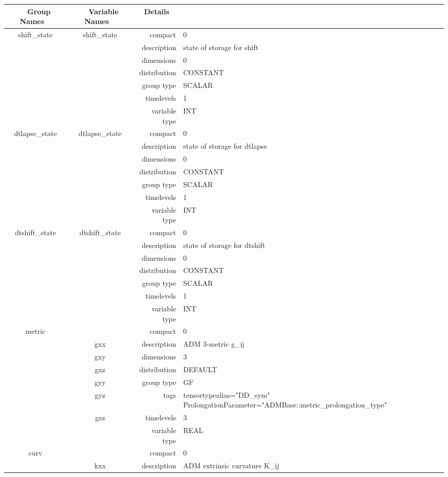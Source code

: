 \documentclass{article}
\begin{document}
\begin{tabular*}{150mm}{|c|c@{\extracolsep{\fill}}|rl|} \hline 
~ {\bf Group Names} ~ & ~ {\bf Variable Names} ~  &{\bf Details} ~ & ~\\ 
\hline 
shift\_state & shift\_state & compact & 0 \\ 
 &  & description & state of storage for shift \\ 
 &  & dimensions & 0 \\ 
 &  & distribution & CONSTANT \\ 
 &  & group type & SCALAR \\ 
 &  & timelevels & 1 \\ 
 &  & variable type & INT \\ 
\hline 
dtlapse\_state & dtlapse\_state & compact & 0 \\ 
 &  & description & state of storage for dtlapse \\ 
 &  & dimensions & 0 \\ 
 &  & distribution & CONSTANT \\ 
 &  & group type & SCALAR \\ 
 &  & timelevels & 1 \\ 
 &  & variable type & INT \\ 
\hline 
dtshift\_state & dtshift\_state & compact & 0 \\ 
 &  & description & state of storage for dtshift \\ 
 &  & dimensions & 0 \\ 
 &  & distribution & CONSTANT \\ 
 &  & group type & SCALAR \\ 
 &  & timelevels & 1 \\ 
 &  & variable type & INT \\ 
\hline 
metric &  & compact & 0 \\ 
 & gxx & description & ADM 3-metric g\_ij \\ 
 & gxy & dimensions & 3 \\ 
 & gxz & distribution & DEFAULT \\ 
 & gyy & group type & GF \\ 
 & gyz & tags & tensortypealias="DD\_sym" ProlongationParameter="ADMBase::metric\_prolongation\_type" \\ 
 & gzz & timelevels & 3 \\ 
 &  & variable type & REAL \\ 
\hline 
curv &  & compact & 0 \\ 
 & kxx & description & ADM extrinsic curvature K\_ij \\ 

\end{tabular*}
\end{document}
